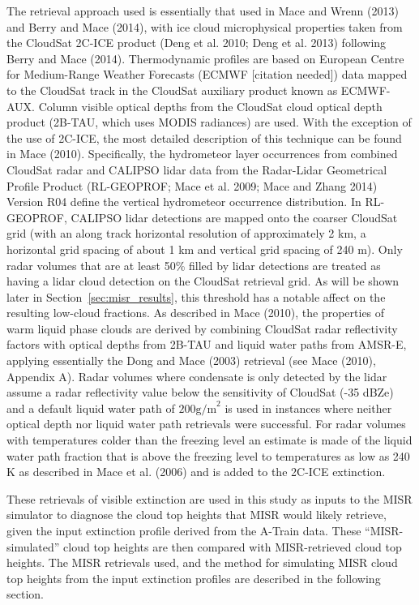 The retrieval approach used is essentially that used in Mace and Wrenn
(2013) and Berry and Mace (2014), with ice cloud microphysical
properties taken from the CloudSat 2C-ICE product (Deng et al. 2010;
Deng et al. 2013) following Berry and Mace (2014). Thermodynamic
profiles are based on European Centre for Medium-Range Weather Forecasts
(ECMWF {[}citation needed{]}) data mapped to the CloudSat track in the
CloudSat auxiliary product known as ECMWF-AUX. Column visible optical
depths from the CloudSat cloud optical depth product (2B-TAU, which uses
MODIS radiances) are used. With the exception of the use of 2C-ICE, the
most detailed description of this technique can be found in Mace (2010).
Specifically, the hydrometeor layer occurrences from combined CloudSat
radar and CALIPSO lidar data from the Radar-Lidar Geometrical Profile
Product (RL-GEOPROF; Mace et al. 2009; Mace and Zhang 2014) Version R04
define the vertical hydrometeor occurrence distribution. In RL-GEOPROF,
CALIPSO lidar detections are mapped onto the coarser CloudSat grid (with
an along track horizontal resolution of approximately 2 km, a horizontal
grid spacing of about 1 km and vertical grid spacing of 240 m). Only
radar volumes that are at least 50\% filled by lidar detections are
treated as having a lidar cloud detection on the CloudSat retrieval
grid. As will be shown later in Section~\ref{sec:misr_results}, this
threshold has a notable affect on the resulting low-cloud fractions. As
described in Mace (2010), the properties of warm liquid phase clouds are
derived by combining CloudSat radar reflectivity factors with optical
depths from 2B-TAU and liquid water paths from AMSR-E, applying
essentially the Dong and Mace (2003) retrieval (see Mace (2010),
Appendix A). Radar volumes where condensate is only detected by the
lidar assume a radar reflectivity value below the sensitivity of
CloudSat (-35 dBZe) and a default liquid water path of
\(200 \textrm{g/m}^2\) is used in instances where neither optical depth
nor liquid water path retrievals were successful. For radar volumes with
temperatures colder than the freezing level an estimate is made of the
liquid water path fraction that is above the freezing level to
temperatures as low as 240 K as described in Mace et al. (2006) and is
added to the 2C-ICE extinction.

These retrievals of visible extinction are used in this study as inputs
to the MISR simulator to diagnose the cloud top heights that MISR would
likely retrieve, given the input extinction profile derived from the
A-Train data. These ``MISR-simulated'' cloud top heights are then
compared with MISR-retrieved cloud top heights. The MISR retrievals
used, and the method for simulating MISR cloud top heights from the
input extinction profiles are described in the following section.

